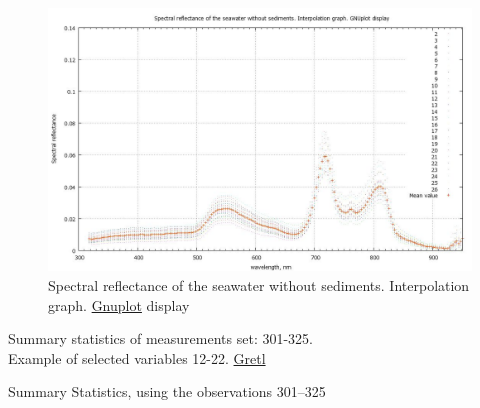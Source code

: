 \documentclass[10pt, a4paper]{article}
\begin{document}
\begin{appendices}
\begin{figure}[h]
	\begin{center}
		\includegraphics[scale=0.22]{GNU-10.jpg}
		\caption{Spectral reflectance of the seawater without sediments. Interpolation graph. \href{http://www.gnuplot.info/}{Gnuplot} display­}
		\label{fig:A.24}
	\end{center}
\end{figure}

\begin{table}[H]
	\begin{center}
		\caption{Summary statistics of measurements set: 301-325. \\ Example of selected variables 12-22. \href{http://gretl.sourceforge.net/}{Gretl}­}\label{tab:16}
		Summary Statistics, using the observations 301--325\\
	
	\vspace{2em}


\end{center}
\end{table}
\end{appendices}
\end{document}
